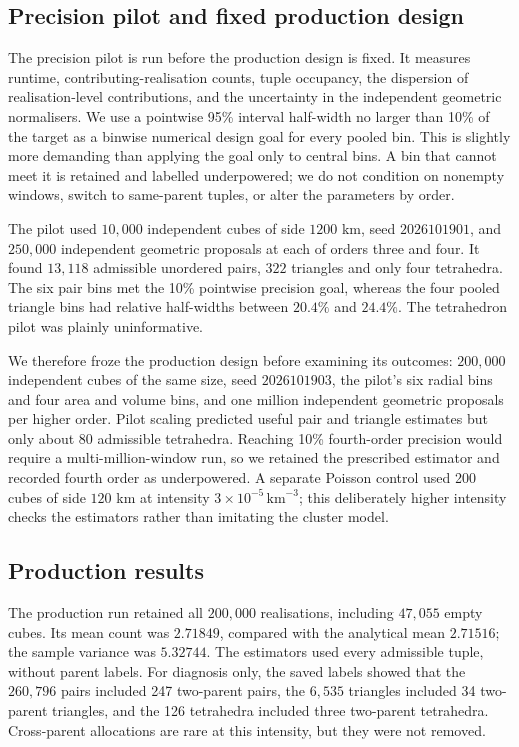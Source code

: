\subsection{Precision pilot and fixed production design}

The precision pilot is run before the production design is fixed. It measures runtime, contributing-realisation counts, tuple occupancy, the dispersion of realisation-level contributions, and the uncertainty in the independent geometric normalisers. We use a pointwise 95\% interval half-width no larger than 10\% of the target as a binwise numerical design goal for every pooled bin. This is slightly more demanding than applying the goal only to central bins. A bin that cannot meet it is retained and labelled underpowered; we do not condition on nonempty windows, switch to same-parent tuples, or alter the parameters by order.

The pilot used $10{,}000$ independent cubes of side $1200$ km, seed
$2026101901$, and $250{,}000$ independent geometric proposals at each of orders
three and four. It found $13{,}118$ admissible unordered pairs, $322$ triangles
and only four tetrahedra. The six pair bins met the 10\% pointwise precision
goal, whereas the four pooled triangle bins had relative half-widths between
$20.4\%$ and $24.4\%$. The tetrahedron pilot was plainly uninformative.

We therefore froze the production design before examining its outcomes:
$200{,}000$ independent cubes of the same size, seed $2026101903$, the pilot's
six radial bins and four area and volume bins, and one million independent
geometric proposals per higher order. Pilot scaling predicted useful pair and
triangle estimates but only about 80 admissible tetrahedra. Reaching 10\%
fourth-order precision would require a multi-million-window run, so we retained
the prescribed estimator and recorded fourth order as underpowered. A separate
Poisson control used 200 cubes of side $120$ km at intensity
$3\times10^{-5}\,\mathrm{km}^{-3}$; this deliberately higher intensity checks
the estimators rather than imitating the cluster model.

\subsection{Production results}

The production run retained all $200{,}000$ realisations, including $47{,}055$
empty cubes. Its mean count was $2.71849$, compared with the analytical mean
$2.71516$; the sample variance was $5.32744$. The estimators used every
admissible tuple, without parent labels. For diagnosis only, the saved labels
showed that the $260{,}796$ pairs included 247 two-parent pairs, the $6{,}535$
triangles included 34 two-parent triangles, and the 126 tetrahedra included
three two-parent tetrahedra. Cross-parent allocations are rare at this
intensity, but they were not removed.

